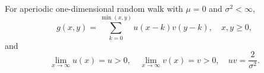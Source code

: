 For aperiodic one-dimensional random walk with \(\mu = 0\) and \(\sigma^2 < \infty\),
\[
g(x,y) = \sum_{k=0}^{\min(x,y)} u(x-k) v(y-k), \quad x,y \geq 0,
\]
and
\[
\lim_{x \to \infty} u(x) = u > 0, \quad \lim_{x \to \infty} v(x) = v > 0, \quad uv = \frac{2}{\sigma^2}.
\]
